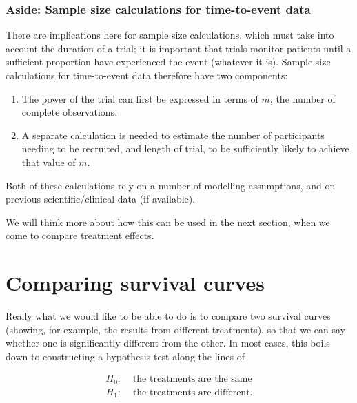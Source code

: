 \documentclass[
  openany]{book}
\providecommand{\tightlist}{%
  \setlength{\itemsep}{0pt}\setlength{\parskip}{0pt}}
\theoremstyle{definition}
\theoremstyle{definition}
\theoremstyle{definition}
\theoremstyle{definition}
\theoremstyle{remark}
\begin{document}
\hypertarget{aside-sample-size-calculations-for-time-to-event-data}{%
\subsection*{Aside: Sample size calculations for time-to-event data}\label{aside-sample-size-calculations-for-time-to-event-data}}

There are implications here for sample size calculations, which must take into account the duration of a trial; it is important that trials monitor patients until a sufficient proportion have experienced the event (whatever it is). Sample size calculations for time-to-event data therefore have two components:

\begin{enumerate}
\def\labelenumi{\arabic{enumi}.}
\tightlist
\item
  The power of the trial can first be expressed in terms of \(m\), the number of complete observations.
\item
  A separate calculation is needed to estimate the number of participants needing to be recruited, and length of trial, to be sufficiently likely to achieve that value of \(m\).
\end{enumerate}

Both of these calculations rely on a number of modelling assumptions, and on previous scientific/clinical data (if available).

We will think more about how this can be used in the next section, when we come to compare treatment effects.

\hypertarget{comparing-survival-curves}{%
\chapter{Comparing survival curves}\label{comparing-survival-curves}}

Really what we would like to be able to do is to compare two survival curves (showing, for example, the results from different treatments), so that we can say whether one is significantly different from the other. In most cases, this boils down to constructing a hypothesis test along the lines of

\[
\begin{aligned}
H_0:&\text{ the treatments are the same}\\
H_1:&\text{ the treatments are different.}
\end{aligned}
\]
\end{document}
